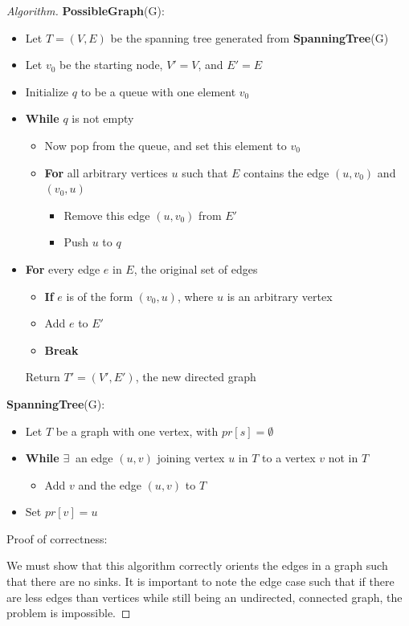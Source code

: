\documentclass[11pt]{article}
\begin{document}
\begin{enumerate}[leftmargin=*,start=0]
\begin{proof}[Algorithm]
\textbf{PossibleGraph}(G):
\begin{itemize}
  \item Let $T = (V, E)$ be the spanning tree generated from \textbf{SpanningTree}(G)
  \item Let $v_0$ be the starting node, $V' = V$, and $E' = E$
  \item Initialize $q$ to be a queue with one element $v_0$
  \item\textbf{While} $q$ is not empty
  \begin{itemize}
    \item Now pop from the queue, and set this element to $v_0$
    \item \textbf{For} all arbitrary vertices $u$ such that $E$ contains the edge $(u, v_0)$ and $(v_0, u)$
    \begin{itemize}
      \item Remove this edge $(u, v_0)$ from $E'$
      \item Push $u$ to $q$
    \end{itemize}
  \end{itemize}
  \item \textbf{For} every edge $e$ in $E$, the original set of edges
  \begin{itemize}
    \item \textbf{If} $e$ is of the form $(v_0, u)$, where $u$ is an arbitrary vertex
    \item Add $e$ to $E'$
    \item \textbf{Break}
  \end{itemize}
  Return $T' = (V', E')$, the new directed graph
\end{itemize}

\textbf{SpanningTree}(G):
\begin{itemize}
  \item Let $T$ be a graph with one vertex, with $pr[s] = \emptyset$
  \item\textbf{While} $\exists \ $ an edge $(u, v)$ joining vertex $u$ in $T$ to a vertex $v$ not in $T$
  \begin{itemize}
    \item Add $v$ and the edge $(u, v)$ to $T$
  \end{itemize}
  \item Set $pr[v] = u$
\end{itemize}

\hfill

Proof of correctness:

We must show that this algorithm correctly orients the edges in a graph such that there are no sinks. It 
is important to note the edge case such that if there are less edges than vertices while still being an undirected, connected 
graph, the problem is impossible. 


\end{proof}
\end{enumerate}
\end{document}
